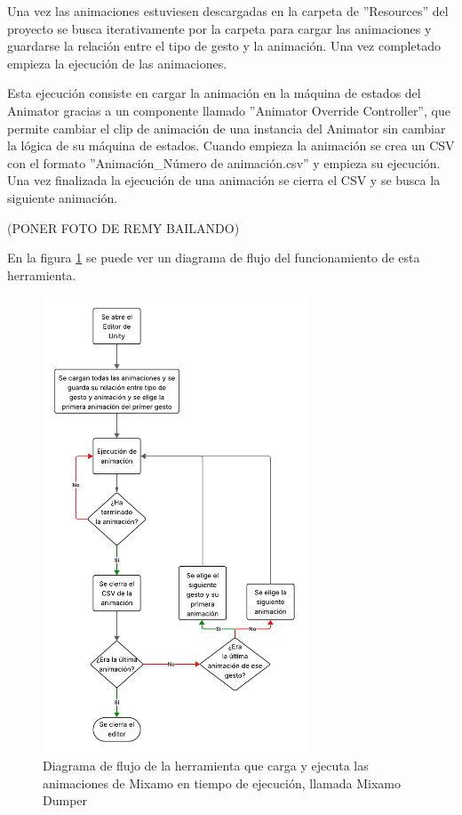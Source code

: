 Una vez las animaciones estuviesen descargadas en la carpeta de ''Resources'' del proyecto se busca iterativamente por la carpeta para cargar las animaciones y guardarse la relación entre el tipo de gesto y la animación.
Una vez completado empieza la ejecución de las animaciones.

Esta ejecución consiste en cargar la animación en la máquina de estados del \gls{Animator} gracias a un componente llamado ''Animator Override Controller'', que permite cambiar el clip de animación de una instancia del \gls{Animator} sin cambiar la lógica de su máquina de estados.
Cuando empieza la animación se crea un CSV con el formato ''Animación\_Número de animación.csv'' y empieza su ejecución.
Una vez finalizada la ejecución de una animación se cierra el CSV y se busca la siguiente animación.

(PONER FOTO DE REMY BAILANDO)

En la figura \ref{fig:MixamoDumper} se puede ver un diagrama de flujo del funcionamiento de esta herramienta.

\begin{figure}[H]
	\centering
	\includegraphics[width=0.7\textwidth]{Imagenes/Vectorial/FlujoMixamoDumper.pdf}
	\caption{Diagrama de flujo de la herramienta que carga y ejecuta las animaciones de Mixamo en tiempo de ejecución, llamada Mixamo Dumper}
	\label{fig:MixamoDumper}
\end{figure}

